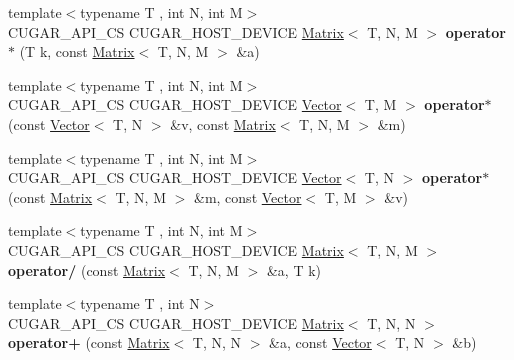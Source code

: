 \begin{DoxyCompactItemize}
\item 
\mbox{\label{namespacecugar_a6959776bf6780af04f6ce7265f8e10c7}} 
{\footnotesize template$<$typename T , int N, int M$>$ }\\C\+U\+G\+A\+R\+\_\+\+A\+P\+I\+\_\+\+CS C\+U\+G\+A\+R\+\_\+\+H\+O\+S\+T\+\_\+\+D\+E\+V\+I\+CE \hyperlink{structcugar_1_1_matrix}{Matrix}$<$ T, N, M $>$ {\bfseries operator$\ast$} (T k, const \hyperlink{structcugar_1_1_matrix}{Matrix}$<$ T, N, M $>$ \&a)
\item 
\mbox{\label{namespacecugar_ad6a4c0cf9d1305aac8f32e5b0d66a017}} 
{\footnotesize template$<$typename T , int N, int M$>$ }\\C\+U\+G\+A\+R\+\_\+\+A\+P\+I\+\_\+\+CS C\+U\+G\+A\+R\+\_\+\+H\+O\+S\+T\+\_\+\+D\+E\+V\+I\+CE \hyperlink{structcugar_1_1_vector}{Vector}$<$ T, M $>$ {\bfseries operator$\ast$} (const \hyperlink{structcugar_1_1_vector}{Vector}$<$ T, N $>$ \&v, const \hyperlink{structcugar_1_1_matrix}{Matrix}$<$ T, N, M $>$ \&m)
\item 
\mbox{\label{namespacecugar_aa7c2eeb7bb60b475b3d6159f478bdd2e}} 
{\footnotesize template$<$typename T , int N, int M$>$ }\\C\+U\+G\+A\+R\+\_\+\+A\+P\+I\+\_\+\+CS C\+U\+G\+A\+R\+\_\+\+H\+O\+S\+T\+\_\+\+D\+E\+V\+I\+CE \hyperlink{structcugar_1_1_vector}{Vector}$<$ T, N $>$ {\bfseries operator$\ast$} (const \hyperlink{structcugar_1_1_matrix}{Matrix}$<$ T, N, M $>$ \&m, const \hyperlink{structcugar_1_1_vector}{Vector}$<$ T, M $>$ \&v)
\item 
\mbox{\label{namespacecugar_aa61cd1eaf0cea27c0e9e91f0be29cdd0}} 
{\footnotesize template$<$typename T , int N, int M$>$ }\\C\+U\+G\+A\+R\+\_\+\+A\+P\+I\+\_\+\+CS C\+U\+G\+A\+R\+\_\+\+H\+O\+S\+T\+\_\+\+D\+E\+V\+I\+CE \hyperlink{structcugar_1_1_matrix}{Matrix}$<$ T, N, M $>$ {\bfseries operator/} (const \hyperlink{structcugar_1_1_matrix}{Matrix}$<$ T, N, M $>$ \&a, T k)
\item 
\mbox{\label{namespacecugar_aa8bbeaea9bd12cbbc498943fdb51e8a6}} 
{\footnotesize template$<$typename T , int N$>$ }\\C\+U\+G\+A\+R\+\_\+\+A\+P\+I\+\_\+\+CS C\+U\+G\+A\+R\+\_\+\+H\+O\+S\+T\+\_\+\+D\+E\+V\+I\+CE \hyperlink{structcugar_1_1_matrix}{Matrix}$<$ T, N, N $>$ {\bfseries operator+} (const \hyperlink{structcugar_1_1_matrix}{Matrix}$<$ T, N, N $>$ \&a, const \hyperlink{structcugar_1_1_vector}{Vector}$<$ T, N $>$ \&b)

\end{DoxyCompactItemize}
